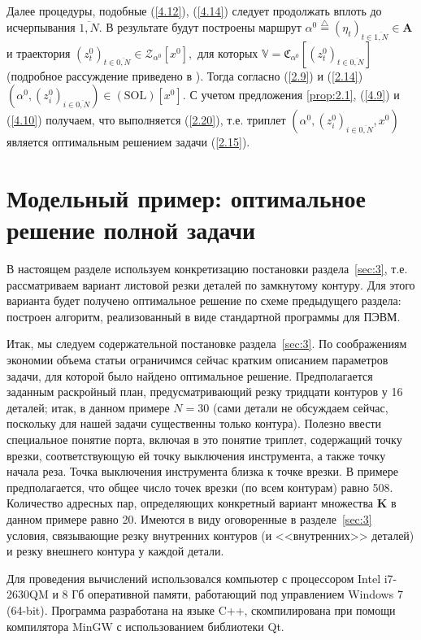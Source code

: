 \documentclass[10pt]{SPIIRAS_Proceedings}
\begin{document}
Далее процедуры, подобные (\ref{4.12}), (\ref{4.14})
следует продолжать вплоть до исчерпывания $\overline{1,N}.$
В результате будут построены маршрут
$\alpha^0 \stackrel{\triangle}{=} (\eta_t)_{t \in \overline{1,N}} \in \mathbf{A}$
и траектория
$(z_t^0)_{t \in \overline{0,N}} \in \mathcal{Z}_{\alpha^0}[x^0],$
для которых
$\mathbb{V} = \mathfrak{C}_{\alpha^0}[(z_t^0)_{t \in \overline{0,N}}]$
(подробное рассуждение приведено в \cite{19}).
Тогда согласно (\ref{2.9}) и (\ref{2.14})
$(\alpha^0,(z_i^0)_{i \in \overline{0,N}}) \in (\mathrm{\mathrm{SOL}})[x^0].$
С учетом предложения \ref{prop:2.1}, (\ref{4.9}) и (\ref{4.10})
получаем, что выполняется (\ref{2.20}),
т.е. триплет
$(\alpha^0,(z_i^0)_{i \in \overline{0,N}},x^0)$
является оптимальным решением задачи (\ref{2.15}).

\section{Модельный пример: оптимальное решение полной задачи}
\label{sec:5}

В настоящем разделе используем конкретизацию постановки раздела~\ref{sec:3},
т.е. рассматриваем вариант листовой резки деталей по замкнутому контуру.
Для этого варианта будет получено оптимальное решение по схеме предыдущего раздела:
построен алгоритм, реализованный в виде стандартной программы для ПЭВМ.

Итак, мы следуем содержательной постановке раздела~\ref{sec:3}.
По соображениям экономии объема
статьи ограничимся сейчас кратким описанием параметров задачи,
для которой было найдено
оптимальное решение.
Предполагается заданным раскройный план,
предусматривающий резку
тридцати контуров у 16 деталей;
итак, в данном примере $N = 30$
(сами детали не обсуждаем
сейчас, поскольку для нашей задачи существенны только контура).
Полезно ввести специальное понятие порта,
включая в это понятие триплет,
содержащий точку врезки,
соответствующую ей точку выключения инструмента,
а также точку начала реза.
Точка выключения инструмента близка к точке врезки.
В примере предполагается, что общее число точек врезки
(по всем контурам)
равно 508.
Количество адресных пар,
определяющих конкретный вариант множества
$\mathbf{K}$
в данном примере равно 20.
Имеются в виду оговоренные в разделе~\ref{sec:3}
условия,
связывающие резку внутренних контуров
(и <<внутренних>> деталей)
и резку внешнего контура у каждой детали.

Для проведения вычислений использовался компьютер с процессором
Intel i7-2630QM и 8 Гб
оперативной памяти,
работающий под управлением Windows 7 (64-bit).
Программа разработана на языке C++,
скомпилирована при помощи компилятора MinGW с использованием библиотеки Qt.
\end{document}
